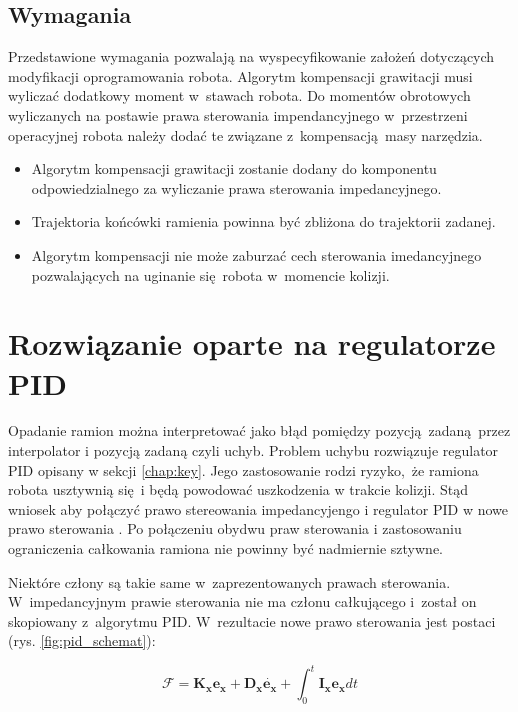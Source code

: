 \subsection{Wymagania}
Przedstawione wymagania pozwalają na wyspecyfikowanie założeń dotyczących modyfikacji oprogramowania robota. Algorytm kompensacji grawitacji musi wyliczać dodatkowy moment w~stawach robota. Do momentów obrotowych wyliczanych na postawie  prawa sterowania impendancyjnego w~przestrzeni operacyjnej robota należy dodać te związane z~kompensacją masy narzędzia.
\begin{itemize}
	\item Algorytm kompensacji grawitacji zostanie dodany do komponentu odpowiedzialnego za wyliczanie prawa sterowania impedancyjnego.
	\item Trajektoria końcówki ramienia powinna być zbliżona do trajektorii zadanej.
	\item Algorytm kompensacji nie może zaburzać cech sterowania imedancyjnego pozwalających na uginanie się robota w~momencie kolizji.
\end{itemize}



\section{Rozwiązanie oparte na regulatorze PID}
\label{chap:rozw_pid}
Opadanie ramion można interpretować jako błąd pomiędzy pozycją zadaną przez interpolator i pozycją zadaną czyli uchyb. Problem uchybu rozwiązuje regulator PID opisany w sekcji \ref{chap:key}. Jego zastosowanie rodzi ryzyko, że ramiona robota usztywnią się i będą powodować uszkodzenia w trakcie kolizji. Stąd wniosek aby połączyć prawo stereowania impedancyjengo i regulator PID w nowe prawo sterowania \cite{bib:gravity2, bib:rozw_pid1}. Po połączeniu obydwu praw sterowania i zastosowaniu ograniczenia całkowania ramiona nie powinny być nadmiernie sztywne. 

Niektóre człony są takie same w~zaprezentowanych prawach sterowania. W~impedancyjnym prawie sterowania nie ma członu całkującego i~został on skopiowany z~algorytmu PID. W~rezultacie nowe prawo sterowania jest postaci (rys. \ref{fig:pid_schemat}):

\begin{equation}
\label{eq:prawo_ster}
\boldsymbol{\mathcal{F}} = \boldsymbol{K_x}\boldsymbol{e_x} + \boldsymbol{D_x}\dot{\boldsymbol{e_x}} + \int_{0}^{t}  \boldsymbol{I_x}\boldsymbol{e_x}dt
\end{equation}

